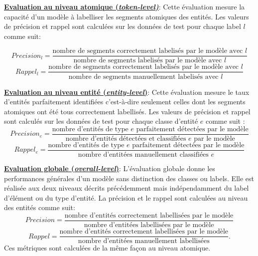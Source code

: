 \noindent \underline{\textbf{Evaluation au niveau atomique (\textit{token-level)}}}: Cette évaluation mesure la capacité d'un modèle à labelliser les segments atomiques des entités. Les valeurs de précision et rappel sont calculées sur les données de test pour chaque label $l$ comme suit:

\[Precision_l = \frac{\text{nombre de segments correctement labelisés par le modèle avec } l} {\text{nombre de segments labelisés par le modèle avec } l}\]
\[Rappel_l = \frac{\text{nombre de segments correctement labelisés par le modèle avec } l} {\text{nombre de segments manuellement labelisés avec } l}\]

\vspace{0.3cm}

\noindent \underline{\textbf{Evaluation au niveau entité (\textit{entity-level})}}: Cette évaluation mesure le taux d'entités parfaitement identifiées c'est-à-dire seulement celles dont les segments atomiques ont été tous correctement labellisés. Les valeurs de précision et rappel sont calculés sur les données de test pour chaque classe d'entité $e$ comme suit :
\[Precision_e = \frac{\text{nombre d'entités de type } e \text{ parfaitement détectées par le modèle}} {\text{nombre d'entités détectées et classifiées } e\text{ par le modèle}}\]
\[Rappel_e = \frac{\text{nombre d'entités de type } e \text{ parfaitement détectées par le modèle}} {\text{nombre d'entitées manuellement classifiées } e}\]

\vspace{0.3cm}

\noindent \underline{\textbf{Evaluation globale (\textit{overall-level})}}: L'évaluation globale donne les performances générales d'un modèle sans distinction des classes ou labels. Elle est réalisée aux deux niveaux décrits précédemment mais indépendamment du label d'élément ou du type d'entité. La précision et le rappel sont calculées au niveau des entités comme suit:
\[Precision = \frac{\text{nombre d'entités correctement labellisées par le modèle}} {\text{nombre d'entitées labellisées par le modèle}}\]
\[Rappel = \frac{\text{nombre d'entités correctement labellisées par le modèle}} {\text{nombre d'entitées  manuellement labellisées}}.\]
Ces métriques sont calculées de la même façon au niveau atomique.

